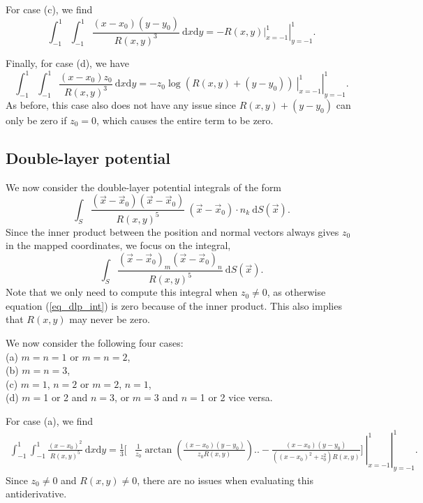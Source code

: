 For case (c), we find
\begin{equation}
\int _{-1}^1\int _{-1}^1
\frac{(x-x_0)(y-y_0) }{R(x,y)^{3}}  \ \text{d}x \text{d}y
= \left. \left.
-R(x,y) \right|_{x=-1}^1 \right|_{y=-1}^1 .
\label{eq_slp_int_xy}
\end{equation}


Finally, for case (d), we have
\begin{equation}
\int_{-1}^1 \int_{-1}^1 \frac{(x-x_0) z_0 }{R(x,y)^{3}}  \ \text{d}x \text{d}y
= \left. \left.
-z_0 \log \left( R(x,y)+  (y-y_0)   \right) \ \right|_{x=-1}^1 \right|_{y=-1}^1 .
\label{eq_slp_int_xz}
\end{equation}
As before, this case also does not have any issue since $R(x,y)+(y-y_0)$ can only be zero if $z_0=0$, which causes the entire term to be zero.  

\subsection{Double-layer potential}

We now consider the double-layer potential integrals of the form
\begin{equation}
 \int_S
 \frac{(\vec{x}-\vec{x}_0)(\vec{x}-\vec{x}_0)     }{R(x,y)^5 }
\ (\vec{x}-\vec{x}_0) \cdot  n_k    \ \text{d}S(\vec{x}).
\label{eq_dlp_int}
\end{equation}
Since the inner product between the position and normal vectors always gives $z_0$ in the mapped coordinates, we focus on the integral,
\begin{equation}
\int_S
 \frac{(\vec{x}-\vec{x}_0)_m(\vec{x}-\vec{x}_0)_n     }{R(x,y)^5 }
    \ \text{d}S(\vec{x}).
\label{eq_dlp_int2}
\end{equation}
Note that we only need to compute this integral when $z_0\neq 0$, as otherwise equation (\ref{eq_dlp_int})  is zero because of the inner product. This also implies that $R(x,y)$ may never be zero.


We now consider the following four cases: \\ (a) $m=n=1$ or $m=n=2$, \\ (b) $m=n=3$, \\ (c) $m=1$, $n=2$ or $m=2$, $n=1$, \\ (d) $m=$1 or 2 and $n=3$, or $m=3$ and $n=$1 or 2 vice versa. 

For case (a), we find
\begin{align}
  \int_{-1}^1 \int_{-1}^1
  \frac{ (x-x_0)^2 }{R(x,y)^5 }
  \ \text{d}x \text{d}y
  =
  \frac{1}{3} 
  \biggl[
  &\frac{1}{z_0}\arctan \left(\frac{(x-x_0)(y-y_0)}{z_0 R(x,y)}\right) \biggr.
  \left. \left. \biggl. -\frac{(x-x_0) (y-y_0)}{\left((x-x_0)^2+z_0^2\right) R(x,y)}
  \biggr]   \ \right|_{x=-1}^1 \right|_{y=-1}^1 .
\label{eq_dlp_int_xx}
\end{align}
Since $z_0\neq0$ and $R(x,y) \neq 0$, there are no issues when evaluating this antiderivative. 

